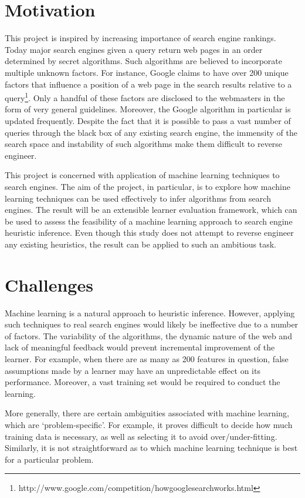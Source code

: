 \documentclass[12pt,a4paper,notitlepage,twoside]{scrbook}
\begin{document}
\section{Motivation}
This project is inspired by increasing importance of search engine rankings.
Today major search engines given a query return web pages in an order
determined by secret algorithms. Such algorithms are believed 
to incorporate multiple unknown factors.
For instance, Google claims to have over 200 unique factors that influence a
position of a web page in the search results relative to a query\footnote{http://www.google.com/competition/howgooglesearchworks.html}. Only
a handful of these factors are disclosed to the webmasters  in the form of very
general guidelines. Moreover, the Google algorithm in particular is updated
frequently. 
Despite the fact that it is possible to pass a vast number of
queries through the black box of any existing search engine, the immensity of
the search space and instability of such algorithms make them difficult to
reverse engineer.

This project is concerned with application of machine learning techniques to search
engines. The aim of the project, in particular, is to explore how machine learning
techniques can be used effectively to infer algorithms from search engines. The result
will be an extensible learner evaluation framework, which can be used to assess the
feasibility of a machine learning approach to search engine heuristic inference.  Even
though this study does not attempt to reverse engineer any existing heuristics, the result
can be applied to such an ambitious task. 

\section{Challenges}
Machine learning is a natural approach to heuristic inference. However, applying such
techniques to real search engines would likely be ineffective due to a number of
factors. The variability of the  algorithms, the dynamic nature of the web and lack of
meaningful feedback would prevent incremental improvement of the learner. For example,
when there are as many as 200 features in question, false assumptions made by a learner
may have an unpredictable effect on its performance. Moreover, a vast training set would
be required to conduct the learning.

More generally, there are certain ambiguities associated with machine learning, which are
`problem-specific'. For example, it proves difficult to decide how much training data is
necessary, as well as selecting it to avoid over/under-fitting\cite{domingos}. Similarly,
it is not straightforward as to which machine learning technique is best for a particular
problem.
\end{document}

